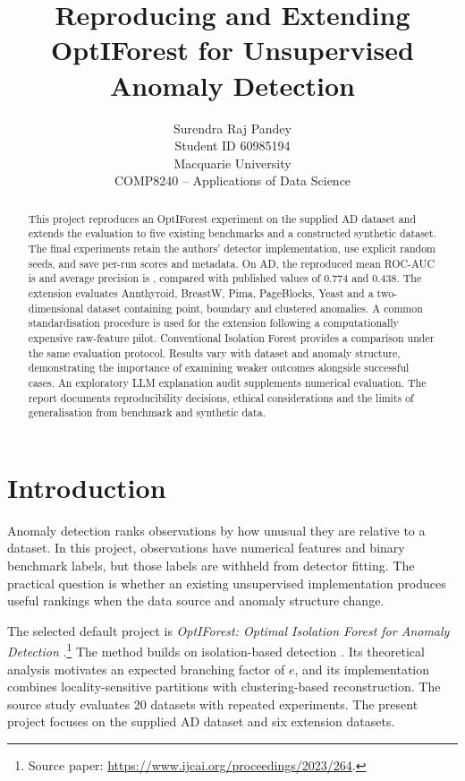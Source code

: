 \documentclass[11pt]{article}
\title{Reproducing and Extending OptIForest for Unsupervised Anomaly Detection}
\author{Surendra Raj Pandey \\ Student ID 60985194 \\ Macquarie University \\ COMP8240 -- Applications of Data Science}
\date{}
\begin{document}
\maketitle
\begin{abstract}
This project reproduces an OptIForest experiment on the supplied AD dataset and extends the evaluation to five existing benchmarks and a constructed synthetic dataset. The final experiments retain the authors' detector implementation, use explicit random seeds, and save per-run scores and metadata. On AD, the reproduced mean ROC-AUC is \adAuc{} and average precision is \adAp{}, compared with published values of 0.774 and 0.438. The extension evaluates Annthyroid, BreastW, Pima, PageBlocks, Yeast and a two-dimensional dataset containing point, boundary and clustered anomalies. A common standardisation procedure is used for the extension following a computationally expensive raw-feature pilot. Conventional Isolation Forest provides a comparison under the same evaluation protocol. Results vary with dataset and anomaly structure, demonstrating the importance of examining weaker outcomes alongside successful cases. An exploratory LLM explanation audit supplements numerical evaluation. The report documents reproducibility decisions, ethical considerations and the limits of generalisation from benchmark and synthetic data.
\end{abstract}

\section{Introduction}
Anomaly detection ranks observations by how unusual they are relative to a dataset. In this project, observations have numerical features and binary benchmark labels, but those labels are withheld from detector fitting. The practical question is whether an existing unsupervised implementation produces useful rankings when the data source and anomaly structure change.

The selected default project is \emph{OptIForest: Optimal Isolation Forest for Anomaly Detection} \citep{xiang2023optiforest}.\footnote{Source paper: \url{https://www.ijcai.org/proceedings/2023/264}.} The method builds on isolation-based detection \citep{liu2008isolation}. Its theoretical analysis motivates an expected branching factor of $e$, and its implementation combines locality-sensitive partitions with clustering-based reconstruction. The source study evaluates 20 datasets with repeated experiments. The present project focuses on the supplied AD dataset and six extension datasets.
\end{document}
